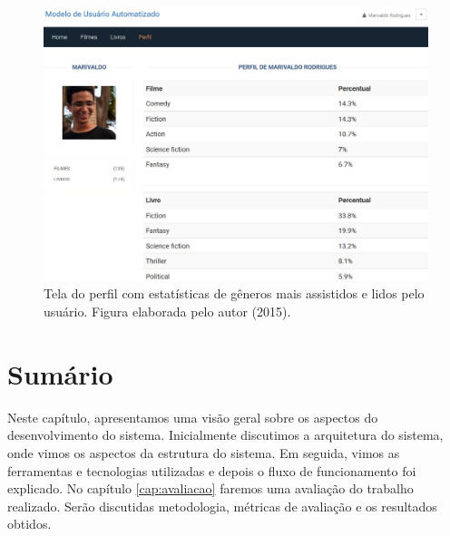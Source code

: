 \begin{figure}[H]
	\centering
	\includegraphics[scale=0.45]{imagens/sistema/usuario-perfil.png}
	\caption{Tela do perfil com estatísticas de gêneros mais assistidos e lidos pelo usuário. Figura elaborada pelo autor (2015).}
	\label{fig:sis-perfil}
\end{figure}







\section{Sumário}

Neste capítulo, apresentamos uma visão geral sobre os aspectos do desenvolvimento do sistema. Inicialmente discutimos a arquitetura do sistema, onde vimos os aspectos da estrutura do sistema. Em seguida, vimos as ferramentas e tecnologias utilizadas e depois o fluxo de funcionamento foi explicado. No capítulo \ref{cap:avaliacao} faremos uma avaliação do trabalho realizado. Serão discutidas metodologia, métricas de avaliação e os resultados obtidos.